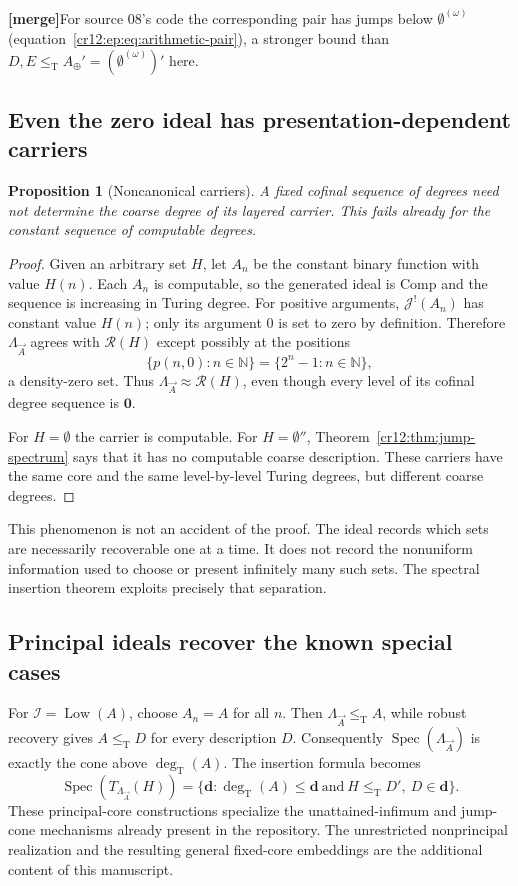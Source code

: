 \documentclass[11pt,letterpaper]{article}
\theoremstyle{plain}
\newtheorem{proposition}[theorem]{Proposition}
\theoremstyle{definition}
\theoremstyle{remark}
\numberwithin{equation}{section}
\newcommand{\N}{\mathbb N}
\newcommand{\leT}{\leq_{\mathrm T}}
\newcommand{\Low}{\operatorname{Low}}
\newcommand{\Spec}{\operatorname{Spec}}
\newcommand{\Comp}{\mathrm{Comp}}
\newcommand{\degT}{\deg_{\mathrm T}}
\newcommand{\Rcode}{\mathcal R}
\newcommand{\zero}{\mathbf 0}
\newcommand{\I}{\mathcal I}
\newcommand{\mergenote}[1]{\par\smallskip\noindent
 {\small\textsf{\textbf{[merge]}}\enspace #1}\par\smallskip}
\newcommand{\Aplus}{A_{\oplus}}          %
\newcommand{\Jfac}{\mathcal J^{!}}       %
\newcommand{\Lam}{\Lambda_{\vec A}}      %
\begin{document}
\mergenote{For source 08's code the corresponding pair has jumps below
$\emptyset^{(\omega)}$ (equation~\eqref{cr12:ep:eq:arithmetic-pair}), a stronger
bound than $D,E\leT\Aplus'=(\emptyset^{(\omega)})'$ here.}

\subsection{Even the zero ideal has presentation-dependent carriers}
\begin{proposition}[Noncanonical carriers]\label{cr12:lr:prop:noncanonical}
A fixed cofinal sequence of \emph{degrees} need not determine the coarse degree of its
layered carrier. This fails already for the constant sequence of computable degrees.
\end{proposition}
\begin{proof}
Given an arbitrary set $H$, let $A_n$ be the constant binary function with value
$H(n)$. Each $A_n$ is computable, so the generated ideal is $\Comp$ and the sequence
is increasing in Turing degree. For positive arguments, $\Jfac(A_n)$ has constant value
$H(n)$; only its argument $0$ is set to zero by definition. Therefore $\Lam$ agrees
with $\Rcode(H)$ except possibly at the positions
\[
 \{p(n,0):n\in\N\}=\{2^n-1:n\in\N\},
\]
a density-zero set. Thus $\Lam\approx\Rcode(H)$, even though every level of its
cofinal degree sequence is $\zero$.

For $H=\emptyset$ the carrier is computable. For $H=\emptyset''$,
Theorem~\ref{cr12:thm:jump-spectrum} says that it has no computable coarse description.
These carriers have the same core and the same level-by-level Turing degrees, but
different coarse degrees.
\end{proof}

This phenomenon is not an accident of the proof. The ideal records which sets are
necessarily recoverable one at a time. It does not record the nonuniform information
used to choose or present infinitely many such sets. The spectral insertion theorem
exploits precisely that separation.

\subsection{Principal ideals recover the known special cases}
For $\I=\Low(A)$, choose $A_n=A$ for all $n$. Then $\Lam\leT A$, while robust recovery
gives $A\leT D$ for every description $D$. Consequently $\Spec(\Lam)$ is exactly the
cone above $\degT(A)$. The insertion formula becomes
\[
 \Spec(T_{\Lam}(H))=\{\mathbf d:\degT(A)\leq\mathbf d\ \text{and}\ H\leT D',\ D\in\mathbf d\}.
\]
These principal-core constructions specialize the unattained-infimum and jump-cone
mechanisms already present in the repository. The unrestricted nonprincipal
realization and the resulting general fixed-core embeddings are the additional content
of this manuscript.
\end{document}
